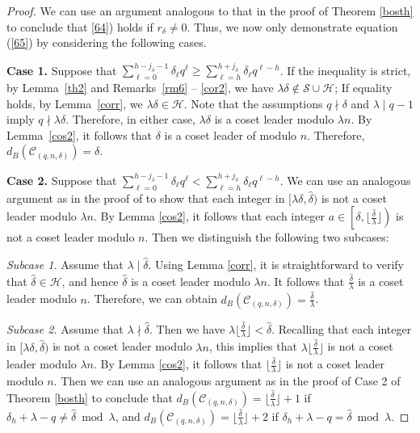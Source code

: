 \documentclass[journal,onecolumn]{IEEEtran}
\begin{document}
\begin{proof}
We can use an argument analogous to that in the proof of Theorem \ref{bosth} to conclude that \ref{64}) holds if $r_{\delta}\neq 0$.  Thus, we now only demonstrate equation (\ref{65}) by considering the following cases. 

 \textbf{Case 1.}
Suppose  that $\sum\limits_{\ell=0}^{h-j_{\delta}-1}\delta_\ell q^\ell
          \ge \sum\limits_{\ell=h}^{h+j_{\delta}}\delta_\ell q^{\ell-h}$.
If the inequality is strict, by Lemma~\ref{th2} and 
Remarks~\ref{rm6} -- \ref{cor2}, we have 
$\lambda\delta\notin\mathcal{S}\cup\mathcal{H}$; 
If equality holds, by Lemma~\ref{corr}, we 
$\lambda\delta\in\mathcal{H}$. Note that the assumptions   $q\nmid\delta$ and $\lambda \mid q-1$ imply $q\nmid \lambda \delta$. Therefore, 
in either case, $\lambda\delta$ is a coset leader modulo
$\lambda n$.
By Lemma~\ref{cos2}, it follows that $\delta$ is a coset leader of
modulo $n$. Therefore,
$d_B(\mathcal{C}_{(q,n,\delta)})=\delta$.

\textbf{Case 2.} 
Suppose that $\sum\limits_{\ell=0}^{h-j_{\delta}-1}\delta_\ell q^\ell<
    \sum\limits_{\ell=h}^{h+j_{\delta}}\delta_\ell  q^{\ell-h}$. We can  use an analogous argument as in the proof of \cite[Theorem 6]{zheng2025}  to show that each integer in $ [\lambda\delta, \hat{\delta})$ is not  a coset leader modulo $\lambda n$.   By Lemma \ref{cos2}, it follows that each integer $a\in \left[\delta, \lfloor \frac{\hat{\delta}}{\lambda}\rfloor \right)$ is not a coset leader modulo $n$. Then we distinguish the following two subcases:

\textit{Subcase 1.} Assume that $\lambda\mid \hat{\delta}$.  Using Lemma \ref{corr}, it is straightforward to verify that $\hat{\delta}\in \mathcal{H}$, and hence $\hat{\delta}$ is a coset leader modulo $\lambda n.$   
    It follows that $\frac{\hat{\delta}}{\lambda}$ is a coset leader modulo $n$. Therefore, we can obtain $d_B(\mathcal{C}_{(q,n,\delta)})=\frac{\hat{\delta}}{{\lambda}}$.  

\textit{Subcase 2.}
Assume that $\lambda \nmid \hat{\delta}$.  Then we have $\lambda\lfloor \frac{\hat{\delta}}{\lambda}\rfloor<\hat{\delta}$. Recalling that each integer in $[\lambda \delta, \hat{\delta} )$ is not a coset leader modulo $\lambda n$, this implies that $\lambda \lfloor \frac{\hat{\delta}}{\lambda}\rfloor$ is not a coset leader modulo $\lambda n$. By Lemma \ref{cos2}, it follows that $\lfloor \frac{\hat{\delta}}{\lambda}\rfloor$ is not a coset leader modulo $n$.  Then we can use an analogous argument as in the proof of Case 2 of Theorem \ref{bosth} to conclude that $d_B(\mathcal{C}_{(q,n,\delta)})=\lfloor \frac{\hat{\delta}}{\lambda}\rfloor + 1 
$ if $\delta_h+\lambda-q\neq \hat{\delta} \bmod \lambda$,
 and $d_B(\mathcal{C}_{(q,n,\delta)})=\lfloor \frac{\hat{\delta}}{\lambda}\rfloor + 2 
$ if  $\delta_h+\lambda-q=  \hat{\delta} \bmod \lambda$. 
\end{proof}
\end{document}
